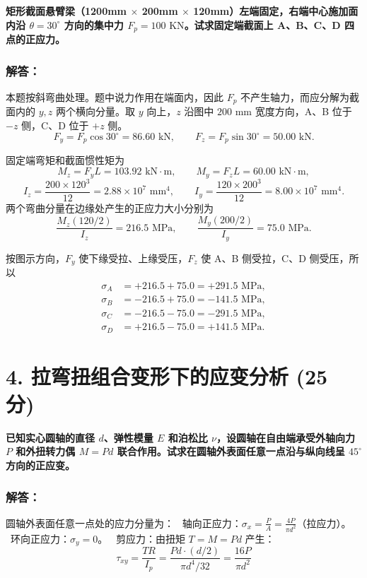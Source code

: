 \documentclass[11pt,a4paper]{ctexrep}
\begin{document}
{\textbf{矩形截面悬臂梁（1200mm $\times$ 200mm $\times$ 120mm）左端固定，右端中心施加面内沿 $\theta = 30^\circ$ 方向的集中力 $F_p = 100\text{ KN}$。试求固定端截面上 A、B、C、D 四点的正应力。}

\subsubsection*{解答：}

本题按斜弯曲处理。题中说力作用在端面内，因此 $F_p$ 不产生轴力，而应分解为截面内的 $y,z$ 两个横向分量。取 $y$ 向上，$z$ 沿图中 $200\text{ mm}$ 宽度方向，A、B 位于 $-z$ 侧，C、D 位于 $+z$ 侧。
\[
F_y=F_p\cos30^\circ=86.60\text{ kN},\qquad
F_z=F_p\sin30^\circ=50.00\text{ kN}.
\]

固定端弯矩和截面惯性矩为
\[
M_z=F_yL=103.92\text{ kN}\cdot\text{m},\qquad
M_y=F_zL=60.00\text{ kN}\cdot\text{m},
\]
\[
I_z=\frac{200\times120^3}{12}=2.88\times10^7\text{ mm}^4,\qquad
I_y=\frac{120\times200^3}{12}=8.00\times10^7\text{ mm}^4.
\]
两个弯曲分量在边缘处产生的正应力大小分别为
\[
\frac{M_z(120/2)}{I_z}=216.5\text{ MPa},\qquad
\frac{M_y(200/2)}{I_y}=75.0\text{ MPa}.
\]

按图示方向，$F_y$ 使下缘受拉、上缘受压，$F_z$ 使 A、B 侧受拉，C、D 侧受压，所以
\[
\begin{aligned}
\sigma_A&=+216.5+75.0=+291.5\text{ MPa},\\
\sigma_B&=-216.5+75.0=-141.5\text{ MPa},\\
\sigma_C&=-216.5-75.0=-291.5\text{ MPa},\\
\sigma_D&=+216.5-75.0=+141.5\text{ MPa}.
\end{aligned}
\]




\section*{4. 拉弯扭组合变形下的应变分析 (25 分)}

\textbf{已知实心圆轴的直径 $d$、弹性模量 $E$ 和泊松比 $\nu$，设圆轴在自由端承受外轴向力 $P$ 和外扭转力偶 $M=Pd$ 联合作用。试求在圆轴外表面任意一点沿与纵向线呈 $45^\circ$ 方向的正应变。}

\subsubsection*{解答：}

圆轴外表面任意一点处的应力分量为：
\noindent\textbullet\ 轴向正应力：$\sigma_x = \frac{P}{A} = \frac{4P}{\pi d^2}$（拉应力）。
\noindent\textbullet\ 环向正应力：$\sigma_y = 0$。
\noindent\textbullet\ 剪应力：由扭矩 $T = M = Pd$ 产生：
  \[
  \tau_{xy} = \frac{T R}{I_p} = \frac{Pd \cdot (d/2)}{\pi d^4 / 32} = \frac{16P}{\pi d^2}
  \]

}
\end{document}
